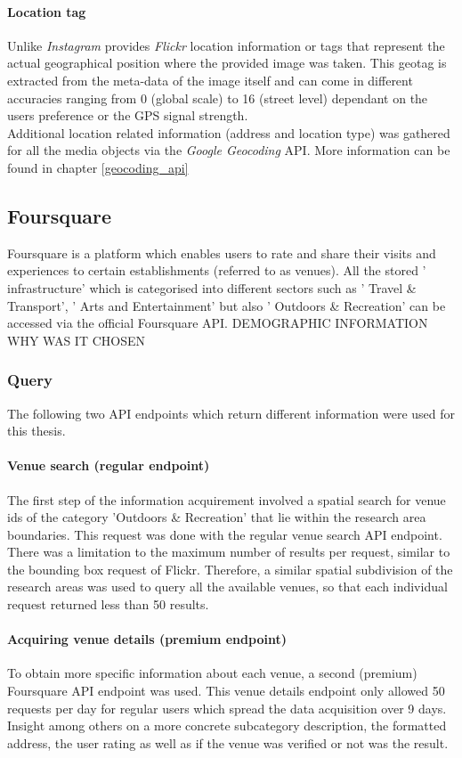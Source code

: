 \paragraph{Location tag} \label{flickr_location_tag}
Unlike \textit{Instagram} provides \textit{Flickr} location information or tags that represent the actual geographical position where the provided image was taken. This geotag is extracted from the meta-data of the image itself and can come in different accuracies ranging from 0 (global scale) to 16 (street level) dependant on the users preference or the GPS signal strength. \\
Additional location related information (address and location type) was gathered for all the media objects via the \textit{Google Geocoding} API. More information can be found in chapter \ref{geocoding_api}

\subsection{Foursquare} \label{foursquare}
Foursquare is a platform which enables users to rate and share their visits and experiences to certain establishments (referred to as venues). All the stored ' infrastructure' which is categorised into different sectors such as ' Travel \& Transport', ' Arts and Entertainment' but also ' Outdoors \& Recreation' can be accessed via the official Foursquare API.
DEMOGRAPHIC INFORMATION
WHY WAS IT CHOSEN
\subsubsection{Query} \label{foursquare_query}
The following two API endpoints which return different information were used for this thesis.
\paragraph{Venue search (regular endpoint)} \label{foursquare_endpoint1}
The first step of the information acquirement involved a spatial search for venue ids of the category 'Outdoors \& Recreation' that lie within the research area boundaries. This request was done with the regular venue search API endpoint. There was a limitation to the maximum number of results per request, similar to the bounding box request of Flickr. Therefore, a similar spatial subdivision of the research areas was used to query all the available venues, so that each individual request returned less than 50 results.
\paragraph{Acquiring venue details (premium endpoint)} \label{foursquare_endpoint2}
To obtain more specific information about each venue, a second (premium) Foursquare API endpoint was used. This venue details endpoint only allowed 50 requests per day for regular users which spread the data acquisition over 9 days. Insight among others on a more concrete subcategory description, the formatted address, the user rating as well as if the venue was verified or not was the result.

